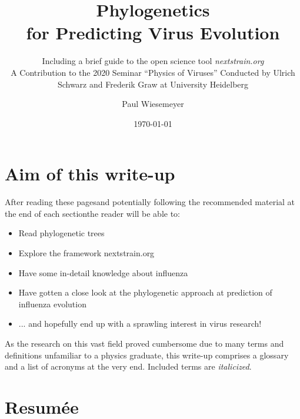 \documentclass[12pt]{scrartcl}
\author{Paul Wiesemeyer}
\title{Phylogenetics\texorpdfstring{\\}{,} for Predicting Virus Evolution}
\subtitle{Including a brief guide to the open science tool {\LARGE\textit{nextstrain.org}} \texorpdfstring{\\[1cm]}{,}A Contribution to the 2020 Seminar ``Physics of Viruses'' Conducted by Ulrich Schwarz and Frederik Graw at University Heidelberg }
\date{\today}
\begin{document}
\maketitle

\clearpage

\section*{Aim of this write-up}

  After reading these pages\textemdash and potentially following the recommended material at the end of each section\textemdash the reader will be able to:
  \begin{itemize}
    \item Read phylogenetic trees
    \item Explore the framework nextstrain.org
    \item Have some in-detail knowledge about influenza
    \item Have gotten a close look at the phylogenetic approach at prediction of influenza evolution
    \item ... and hopefully end up with a sprawling interest in virus research!
  \end{itemize}

  As the research on this vast field proved cumbersome due to many terms and definitions unfamiliar to a physics graduate, this write-up comprises a glossary and a list of acronyms at the very end. Included terms are \textit{italicized}.

\vfill

\tableofcontents

\clearpage

\section{Resumée}
\end{document}
